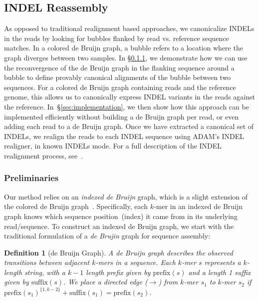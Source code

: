 \documentclass{bioinfo}
\newtheorem{defn}{Definition}
\begin{document}
\begin{methods}
\subsection{INDEL Reassembly}
\label{sec:indel-reassembly}

As opposed to traditional realignment based approaches, we canonicalize INDELs
in the reads by looking for bubbles flanked by read vs. reference sequence matches. In a colored de Bruijn
graph, a bubble refers to a location where the graph diverges between two
samples. In \S\ref{sec:formulation}, we demonstrate how we can use the
reconvergence of the de Bruijn graph in the flanking sequence around a bubble
to define provably canonical alignments of the bubble between two sequences.
For a colored de Bruijn graph containing reads and the reference genome, this
allows us to canonically express INDEL variants in the reads against the
reference. In~\S\ref{sec:implementation}, we then show how this approach
can be implemented efficiently without building a de Bruijn graph per read,
or even adding each read to a de Bruijn graph. Once we have extracted a
canonical set of INDELs, we realign the reads to each INDEL sequence using
\textsc{ADAM}'s INDEL realigner, in known INDELs mode. For a full description
of the INDEL realignment process, see~\citet{nothaft15avocado}.

\subsubsection{Preliminaries}
\label{sec:formulation}

Our method relies on an \emph{indexed de Bruijn} graph, which is a slight
extension of the colored de Bruijn graph~\citep{iqbal12}. Specifically, each
$k$-mer in an indexed de Bruijn graph knows which sequence position~(index)
it came from in its underlying read/sequence. To construct an indexed de
Bruijn graph, we start with the traditional formulation of a \emph{de Brujin}
graph for sequence assembly:

\begin{defn}[de Bruijn Graph]
\label{defn:dbg}
A de Bruijn graph describes the observed transitions between adjacent $k$-mers in a sequence. Each
$k$-mer $s$ represents a $k$-length string, with a $k - 1$ length prefix given by $\text{prefix}(s)$ and a
length 1 suffix given by $\text{suffix}(s)$. We place a directed edge ($\rightarrow$) from $k$-mer $s_1$ to
$k$-mer $s_2$ if $\text{prefix}(s_1)^{\{1, k - 2\}} + \text{suffix}(s_1) = \text{prefix}(s_2)$.
\end{defn}


\end{methods}
\end{document}
